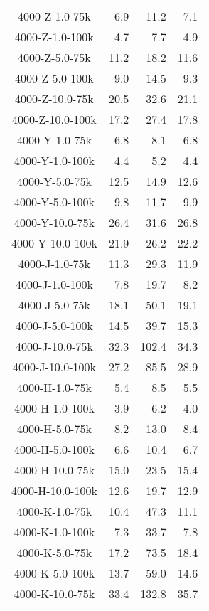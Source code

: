 \begin{longtable}{crrr}
    4000-Z-1.0-75k   &    6.9 &   11.2 &    7.1 \\
    4000-Z-1.0-100k  &    4.7 &    7.7 &    4.9 \\
    4000-Z-5.0-75k   &   11.2 &   18.2 &   11.6 \\
    4000-Z-5.0-100k  &    9.0 &   14.5 &    9.3 \\
    4000-Z-10.0-75k  &   20.5 &   32.6 &   21.1 \\
    4000-Z-10.0-100k &   17.2 &   27.4 &   17.8 \\
    4000-Y-1.0-75k   &    6.8 &    8.1 &    6.8 \\
    4000-Y-1.0-100k  &    4.4 &    5.2 &    4.4 \\
    4000-Y-5.0-75k   &   12.5 &   14.9 &   12.6 \\
    4000-Y-5.0-100k  &    9.8 &   11.7 &    9.9 \\
    4000-Y-10.0-75k  &   26.4 &   31.6 &   26.8 \\
    4000-Y-10.0-100k &   21.9 &   26.2 &   22.2 \\
    4000-J-1.0-75k   &   11.3 &   29.3 &   11.9 \\
    4000-J-1.0-100k  &    7.8 &   19.7 &    8.2 \\
    4000-J-5.0-75k   &   18.1 &   50.1 &   19.1 \\
    4000-J-5.0-100k  &   14.5 &   39.7 &   15.3 \\
    4000-J-10.0-75k  &   32.3 &  102.4 &   34.3 \\
    4000-J-10.0-100k &   27.2 &   85.5 &   28.9 \\
    4000-H-1.0-75k   &    5.4 &    8.5 &    5.5 \\
    4000-H-1.0-100k  &    3.9 &    6.2 &    4.0 \\
    4000-H-5.0-75k   &    8.2 &   13.0 &    8.4 \\
    4000-H-5.0-100k  &    6.6 &   10.4 &    6.7 \\
    4000-H-10.0-75k  &   15.0 &   23.5 &   15.4 \\
    4000-H-10.0-100k &   12.6 &   19.7 &   12.9 \\
    4000-K-1.0-75k   &   10.4 &   47.3 &   11.1 \\
    4000-K-1.0-100k  &    7.3 &   33.7 &    7.8 \\
    4000-K-5.0-75k   &   17.2 &   73.5 &   18.4 \\
    4000-K-5.0-100k  &   13.7 &   59.0 &   14.6 \\
    4000-K-10.0-75k  &   33.4 &  132.8 &   35.7 \\

\end{longtable}
